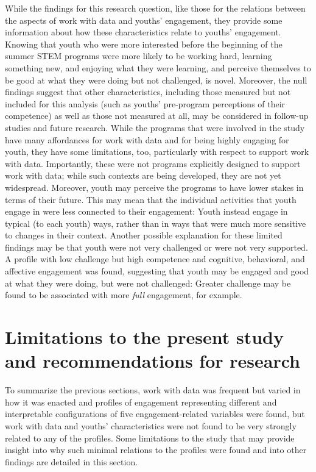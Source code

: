 \documentclass[]{msu-thesis}
\theoremstyle{definition}
\theoremstyle{definition}
\theoremstyle{definition}
\theoremstyle{remark}
\begin{document}
While the findings for this research question, like those for the
relations between the aspects of work with data and youths' engagement,
they provide some information about how these characteristics relate to
youths' engagement. Knowing that youth who were more interested before
the beginning of the summer STEM programs were more likely to be working
hard, learning something new, and enjoying what they were learning, and
perceive themselves to be good at what they were doing but not
challenged, is novel. Moreover, the null findings suggest that other
characteristics, including those measured but not included for this
analysis (such as youths' pre-program perceptions of their competence)
as well as those not measured at all, may be considered in follow-up
studies and future research. While the programs that were involved in
the study have many affordances for work with data and for being highly
engaging for youth, they have some limitations, too, particularly with
respect to support work with data. Importantly, these were not programs
explicitly designed to support work with data; while such contexts are
being developed, they are not yet widespread. Moreover, youth may
perceive the programs to have lower stakes in terms of their future.
This may mean that the individual activities that youth engage in were
less connected to their engagement: Youth instead engage in typical (to
each youth) ways, rather than in ways that were much more sensitive to
changes in their context. Another possible explanation for these limited
findings may be that youth were not very challenged or were not very
supported. A profile with low challenge but high competence and
cognitive, behavioral, and affective engagement was found, suggesting
that youth may be engaged and good at what they were doing, but were not
challenged: Greater challenge may be found to be associated with more
\emph{full} engagement, for example.

\section{Limitations to the present study and recommendations for
research}\label{limitations-to-the-present-study-and-recommendations-for-research}

To summarize the previous sections, work with data was frequent but
varied in how it was enacted and profiles of engagement representing
different and interpretable configurations of five engagement-related
variables were found, but work with data and youths' characteristics
were not found to be very strongly related to any of the profiles. Some
limitations to the study that may provide insight into why such minimal
relations to the profiles were found and into other findings are
detailed in this section.
\end{document}
